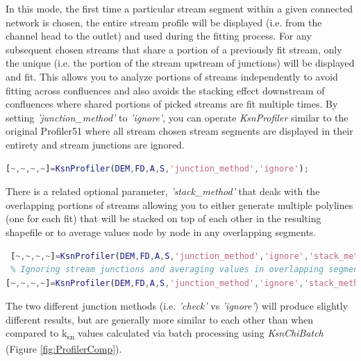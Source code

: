\noindent
In this mode, the first time a particular stream segment within a given connected network is chosen, the entire stream profile will be displayed (i.e. from the channel head to the outlet) and used during the fitting process. For any subsequent chosen streams that share a portion of a previously fit stream, only the unique (i.e. the portion of the stream upstream of junctions) will be displayed and fit. This allows you to analyze portions of streams independently to avoid fitting across confluences and also avoids the stacking effect downstream of confluences where shared portions of picked streams are fit multiple times. By setting \textit{'junction\_method'} to \textit{'ignore'}, you can operate \textit{KsnProfiler} similar to the original Profiler51 where all stream chosen stream segments are displayed in their entirety and stream junctions are ignored.

 \begin{lstlisting}[language=Matlab]
% To run KsnProfiler similar to how Profiler51 operated and fit all selected streams in their entirety:
[~,~,~,~]=KsnProfiler(DEM,FD,A,S,'junction_method','ignore');
\end{lstlisting}

\noindent
 There is a related optional parameter, \textit{'stack\_method'} that deals with the overlapping portions of streams allowing you to either generate multiple polylines (one for each fit) that will be stacked on top of each other in the resulting shapefile or to average values node by node in any overlapping segments. 
 
  \begin{lstlisting}[language=Matlab]
 % Ignoring stream junctions and stacking polylines in output shapefile:
 [~,~,~,~]=KsnProfiler(DEM,FD,A,S,'junction_method','ignore','stack_method','stack');
 % Ignoring stream junctions and averaging values in overlapping segments before producing output shapefile:
[~,~,~,~]=KsnProfiler(DEM,FD,A,S,'junction_method','ignore','stack_method','average');
 \end{lstlisting}
 
 \noindent
 The two different junction methods (i.e. \textit{'check'} vs \textit{'ignore'}) will produce slightly different results, but are generally more similar to each other than when compared to k\textsubscript{sn} values calculated via batch processing using \textit{KsnChiBatch} (Figure \ref{fig:ProfilerComp}).

